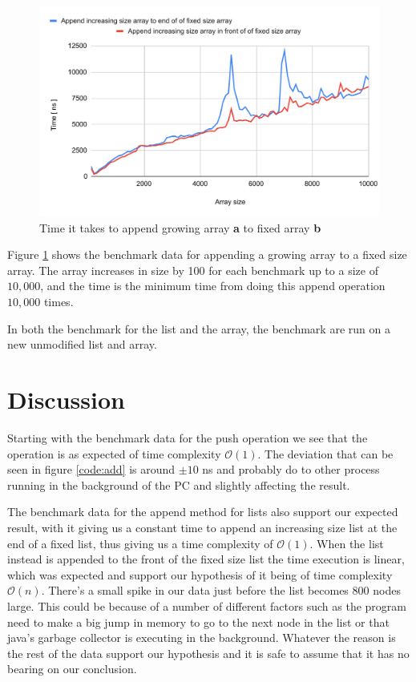 \documentclass[a4paper,11pt]{article}
\begin{document}
\begin{figure}[h]
    \centering
    \includegraphics[width=.8\textwidth]{arrayAppend.pdf}
    \caption{Time it takes to append growing array \textbf{a} to fixed array \textbf{b}}
    \label{fig:arrayAppend}
\end{figure}

Figure \ref{fig:arrayAppend} shows the benchmark data for appending a growing array to a fixed size array. The array increases in
size by 100 for each benchmark up to a size of $10,000$, and the time is the minimum time from doing this append operation $10,000$
times.

In both the benchmark for the list and the array, the benchmark are run on a new unmodified list and array.
\FloatBarrier
\section*{Discussion}
Starting with the benchmark data for the push operation we see that the operation is as expected
of time complexity $\mathcal{O}(1)$. The deviation that can be seen in figure \ref{code:add}
is around $\pm 10$ ns and probably do to other process running in the background
of the PC and slightly affecting the result.

The benchmark data for the append method for lists also support our expected result, with it
giving us a constant time to append an increasing size list at the end of a fixed list, thus
giving us a time complexity of $\mathcal{O}(1)$. When the list instead is appended to
the front of the fixed size list the time execution is linear, which was expected and support
our hypothesis of it being of time complexity $\mathcal{O}(n)$. There's a small spike in our
data just before the list becomes 800 nodes large. This could be because of a number of
different factors such as the program need to make a big jump in memory to go to the next
node in the list or that java's garbage collector is executing in the background.
Whatever the reason is the rest of the data support our hypothesis and it is safe to assume
that it has no bearing on our conclusion.
\end{document}
